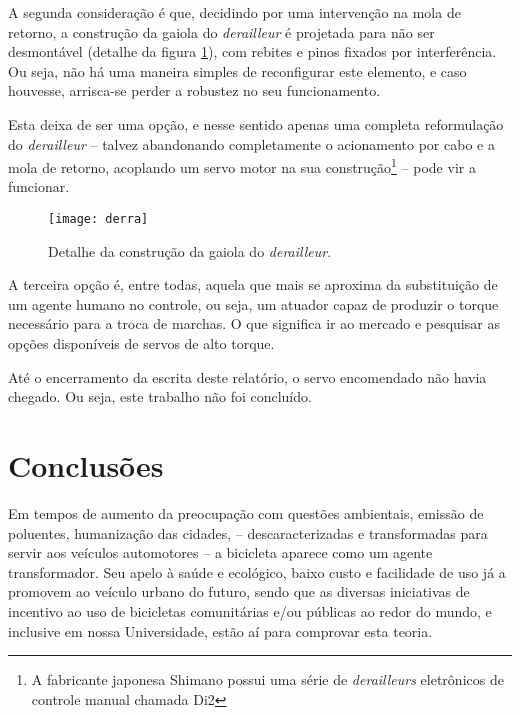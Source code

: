 \documentclass[a4paper,11pt]{article}
\begin{document}
A segunda consideração é que, decidindo por uma intervenção na mola de retorno,
a construção da gaiola do \textit{derailleur} é projetada para não ser
desmontável (detalhe da figura \ref{fig:derra}), com rebites e pinos
fixados por interferência. Ou seja, não há uma maneira simples de reconfigurar
este elemento, e caso houvesse, arrisca-se perder a robustez no seu
funcionamento.

Esta deixa de ser uma opção, e nesse sentido apenas uma completa
reformulação do \textit{derailleur} -- talvez abandonando completamente o
acionamento por cabo e a mola de retorno, acoplando um servo motor na sua
construção\footnote{A fabricante japonesa Shimano possui uma série de
\textit{derailleurs} eletrônicos de controle manual chamada Di2} -- pode vir a
funcionar.

\begin{figure}[ht!]
\begin{center}
 \texttt{[image: derra]}
\end{center}
  \caption{Detalhe da construção da gaiola do \textit{derailleur}.}
  \label{fig:derra}
\end{figure}

A terceira opção é, entre todas, aquela que mais se aproxima da substituição de
um agente humano no controle, ou seja, um atuador capaz de produzir o torque
necessário para a troca de marchas. O que significa ir ao mercado e pesquisar
as opções disponíveis de servos de alto torque.

Até o encerramento da escrita deste relatório, o servo encomendado não havia
chegado. Ou seja, este trabalho não foi concluído.



\pagebreak
%
\section{Conclusões}
\label{sec:conclusoes}

Em tempos de aumento da preocupação com questões ambientais, emissão de
poluentes, humanização das cidades, -- descaracterizadas e transformadas para
servir aos veículos automotores -- a bicicleta aparece como um agente
transformador. Seu apelo à saúde e ecológico, baixo custo e facilidade de uso
já a promovem ao veículo urbano do futuro, sendo que as diversas iniciativas de
incentivo ao uso de bicicletas comunitárias e/ou públicas ao redor do mundo, e
inclusive em nossa Universidade, estão aí para comprovar esta teoria. 
\end{document}
